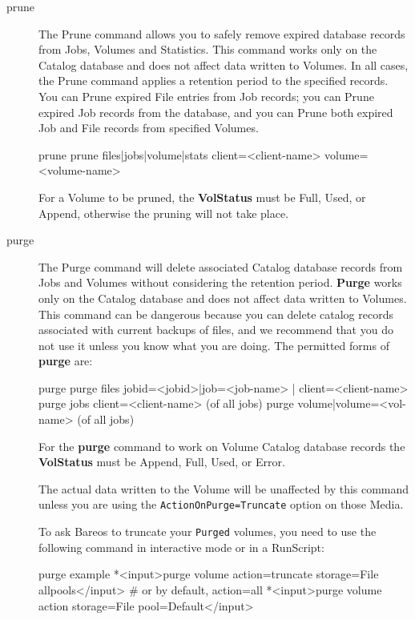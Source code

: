 \begin{description}
\item [prune]
   \label{ManualPruning}
   The Prune command allows you to safely remove expired database records from
   Jobs, Volumes and Statistics.  This command works only on the Catalog
   database and does not affect data written to Volumes.  In all cases, the
   Prune command applies a retention period to the specified records.  You can
   Prune expired File entries from Job records; you can Prune expired Job
   records from the database, and you can Prune both expired Job and File
   records from specified Volumes.

\begin{bconsole}{prune}
prune files|jobs|volume|stats client=<client-name> volume=<volume-name>
\end{bconsole}

   For a Volume to be pruned, the {\bf VolStatus} must be Full, Used, or
   Append, otherwise the pruning will not take place.

\item [purge]
   The Purge command will delete associated Catalog database records from
   Jobs and Volumes without considering the retention period.  {\bf Purge}
   works only on the Catalog database and does not affect data written to
   Volumes.  This command can be dangerous because you can delete catalog
   records associated with current backups of files, and we recommend that
   you do not use it unless you know what you are doing.  The permitted
   forms of {\bf purge} are:

\begin{bconsole}{purge}
purge files jobid=<jobid>|job=<job-name> | client=<client-name>
purge jobs client=<client-name> (of all jobs)
purge volume|volume=<vol-name> (of all jobs)
\end{bconsole}

For the {\bf purge} command to work on Volume Catalog database  records the
{\bf VolStatus}  must be Append, Full, Used, or Error.

The actual data written to the Volume will be unaffected by this command unless
you are using the \texttt{ActionOnPurge=Truncate} option on those Media.

To ask Bareos to truncate your \texttt{Purged} volumes, you need to use the
following command in interactive mode or in a RunScript:
\begin{bconsole}{purge example}
*<input>purge volume action=truncate storage=File allpools</input>
# or by default, action=all
*<input>purge volume action storage=File pool=Default</input>
\end{bconsole}


\end{description}
